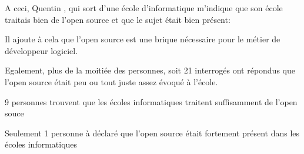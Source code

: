			A ceci, Quentin , qui sort d'une école d'informatique m'indique que son école traitais bien de l'open source et que le sujet était bien présent:

			\begin{center}
				\textit{
				}
			\end{center}

			Il ajoute à cela que l'open source est une brique nécessaire pour le métier de développeur logiciel.

			\begin{center}
				\textit{
				}
			\end{center}

			Egalement, plus de la moitiée des personnes, soit 21 interrogés ont répondus que l'open source était peu ou tout juste assez évoqué à l'école.

			9 personnes trouvent que les écoles informatiques traitent suffisamment de l'open souce

			Seulement 1 personne à déclaré que l'open source était fortement présent dans les écoles informatiques

